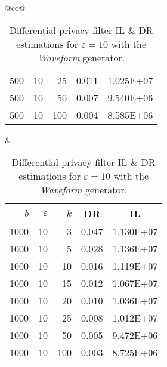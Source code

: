 \begin{table}[H]
\begin{tabular}{@{}cc@{}}
\begin{tabular}{@{}rrrrr@{}}
			500	&	10	&	25	&	0.011	&	1.025E+07 \\
			500	&	10	&	50	&	0.007	&	9.540E+06 \\
			500	&	10	&	100	&	0.004	&	8.585E+06 \\
		\end{tabular}
		&
		\begin{tabular}{@{}rrrrr@{}}
			\toprule
			$b$ & $\varepsilon$ & $k$ & \multicolumn{1}{c}{DR} & \multicolumn{1}{c}{IL} \\ \midrule
			1000	&	10	&	3	&	0.047	&	1.130E+07 \\
			1000	&	10	&	5	&	0.028	&	1.136E+07 \\
			1000	&	10	&	10	&	0.016	&	1.119E+07 \\
			1000	&	10	&	15	&	0.012	&	1.067E+07 \\
			1000	&	10	&	20	&	0.010	&	1.036E+07 \\
			1000	&	10	&	25	&	0.008	&	1.012E+07 \\
			1000	&	10	&	50	&	0.005	&	9.472E+06 \\
			1000	&	10	&	100	&	0.003	&	8.725E+06 \\
		\end{tabular}
	\end{tabular}
	\caption[Differential privacy filter DR \& IL estimations (Waveform), $\varepsilon = 10$.]{Differential privacy filter IL \& DR estimations for $\varepsilon = 10$ with the \textit{Waveform} generator.}
\end{table}

